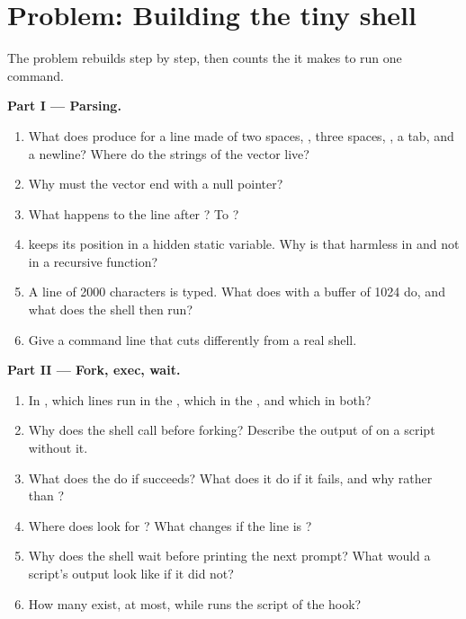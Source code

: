 \section{Problem: Building the tiny shell}\label{sec:b2:processes-and-system-calls:problem}

\begin{problem}\label{pb:b2:processes-and-system-calls:1}
The problem rebuilds  step by step, then counts the  it makes to run one command.

\medskip\noindent\textbf{Part I --- Parsing.}\par\nopagebreak
\begin{enumerate}
\item What does  produce for a line made of two spaces, , three spaces, , a tab,
 and a newline? Where do the strings of the vector live?
\item Why must the vector end with a null pointer?
\item What happens to the line  after ? To ?
\item {} keeps its position in a hidden static variable. Why is that harmless in  and not in
a recursive function?
\item A line of 2000 characters is typed. What does  with a buffer of 1024 do, and what does the shell
then run?
\item Give a command line that  cuts differently from a real shell.
\end{enumerate}

\medskip\noindent\textbf{Part II --- Fork, exec, wait.}\par\nopagebreak
\begin{enumerate}[resume, beginpenalty=10000]
\item In , which lines run in the , which in the , and which in both?
\item Why does the shell call  before forking? Describe the output of  on a script
without it.
\item What does the  do if  succeeds? What does it do if it fails, and why  rather than
?
\item Where does  look for ? What changes if the line is ?
\item Why does the shell wait before printing the next prompt? What would a script's output look like if it did not?
\item How many  exist, at most, while  runs the script of the hook?
\end{enumerate}


\end{problem}
